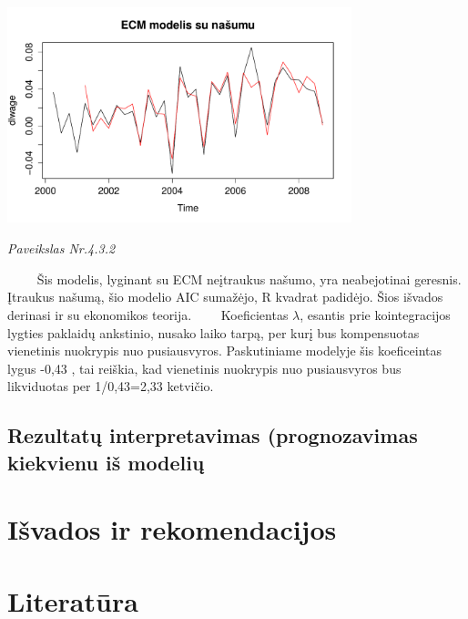 \documentclass[12pt,a4paper]{article}
\theoremstyle{change}\newtheorem{salyga}{Uždavinys}
\begin{document}
  \begin{center}
\includegraphics[width=100mm,height=70mm]{ecm23}
\\ \textit{Paveikslas Nr.4.3.2}
\end{center}        
\vskip 8pt
$\qquad$ Šis modelis, lyginant su ECM neįtraukus našumo, yra neabejotinai geresnis. Įtraukus našumą, šio modelio AIC sumažėjo, R kvadrat  padidėjo. Šios išvados derinasi ir su ekonomikos teorija. 
\vskip 8pt
$\qquad$Koeficientas $ \lambda $, esantis prie kointegracijos lygties paklaidų ankstinio, nusako laiko tarpą, per kurį bus kompensuotas vienetinis nuokrypis nuo pusiausvyros. Paskutiniame modelyje šis koeficeintas lygus -0,43 , tai reiškia, kad vienetinis nuokrypis nuo pusiausvyros bus likviduotas per 1/0,43=2,33 ketvičio. 
\vskip 8pt



\subsection{Rezultatų interpretavimas (prognozavimas kiekvienu iš modelių}



\section{Išvados ir rekomendacijos}    
     
\section{Literatūra}       
     
\end{document}
